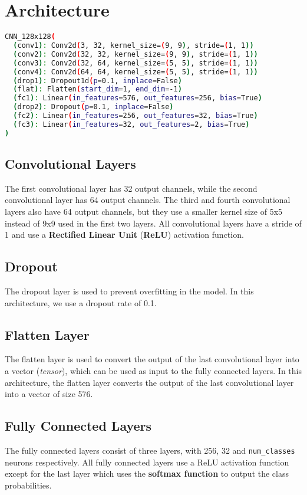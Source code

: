 \documentclass{report}
\begin{document}
\section{Architecture}


\begin{lstlisting}[language=bash]
CNN_128x128(
  (conv1): Conv2d(3, 32, kernel_size=(9, 9), stride=(1, 1))
  (conv2): Conv2d(32, 32, kernel_size=(9, 9), stride=(1, 1))
  (conv3): Conv2d(32, 64, kernel_size=(5, 5), stride=(1, 1))
  (conv4): Conv2d(64, 64, kernel_size=(5, 5), stride=(1, 1))
  (drop1): Dropout1d(p=0.1, inplace=False)
  (flat): Flatten(start_dim=1, end_dim=-1)
  (fc1): Linear(in_features=576, out_features=256, bias=True)
  (drop2): Dropout(p=0.1, inplace=False)
  (fc2): Linear(in_features=256, out_features=32, bias=True)
  (fc3): Linear(in_features=32, out_features=2, bias=True)
)
\end{lstlisting}


\subsection{Convolutional Layers}

The first convolutional layer has 32 output channels, while the second convolutional layer has 64 output channels. The third and fourth convolutional layers also have 64 output channels, but they use a smaller kernel size of 5x5 instead of 9x9 used in the first two layers. All convolutional layers have a stride of 1 and use a \textbf{Rectified Linear Unit} (\textbf{ReLU}) activation function.
\subsection{Dropout}

The dropout layer is used to prevent overfitting in the model. In this architecture, we use a dropout rate of 0.1.
\subsection{Flatten Layer}

The flatten layer is used to convert the output of the last convolutional layer into a vector (\textit{tensor}), which can be used as input to the fully connected layers. In this architecture, the flatten layer converts the output of the last convolutional layer into a vector of size 576.

\subsection{Fully Connected Layers}
The fully connected layers consist of three layers, with 256, 32 and \texttt{num\_classes}  neurons respectively. All fully connected layers use a ReLU activation function except for the last layer which uses the \textbf{softmax function} to output the class probabilities.
\end{document}
